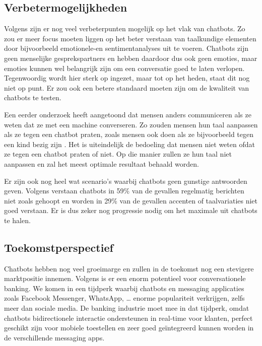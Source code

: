 \subsection{Verbetermogelijkheden}
\label{subsec:verbetermogelijkheden}

Volgens \textcite{Hussain2019} zijn er nog veel verbeterpunten mogelijk op het vlak van chatbots. Zo zou er meer focus moeten liggen op het beter verstaan van taalkundige elementen door bijvoorbeeld emotionele-en sentimentanalyses uit te voeren. Chatbots zijn geen menselijke gesprekspartners en hebben daardoor dus ook geen emoties, maar emoties kunnen wel belangrijk zijn om een conversatie goed te laten verlopen. Tegenwoordig wordt hier sterk op ingezet, maar tot op het heden, staat dit nog niet op punt. Er zou ook een betere standaard moeten zijn om de kwaliteit van chatbots te testen.

Een eerder onderzoek heeft aangetoond dat mensen anders communiceren als ze weten dat ze met een machine converseren. Zo zouden mensen hun taal aanpassen als ze tegen een chatbot praten, zoals mensen ook doen als ze bijvoorbeeld tegen een kind bezig zijn \autocite{Hill2015}. Het is uiteindelijk de bedoeling dat mensen niet weten ofdat ze tegen een chatbot praten of niet. Op die manier zullen ze hun taal niet aanpassen en zal het meest optimale resultaat behaald worden. 

Er zijn ook nog heel wat scenario’s waarbij chatbots geen gunstige antwoorden geven. Volgens \textcite{BRAIN2019} verstaan chatbots in 59\% van de gevallen regelmatig berichten niet zoals gehoopt en worden in 29\% van de gevallen accenten of taalvariaties niet goed verstaan. Er is dus zeker nog progressie nodig om het maximale uit chatbots te halen.

\subsection{Toekomstperspectief}
\label{subsec:toekomstperspectief}

Chatbots hebben nog veel groeimarge en zullen in de toekomst nog een stevigere marktpositie innemen. Volgens \textcite{Andreoli2017} is er een enorm potentieel voor conversationele banking. We komen in een tijdperk waarbij chatbots en messaging applicaties zoals Facebook Messenger, WhatsApp, … enorme populariteit verkrijgen, zelfs meer dan sociale media. De banking industrie moet mee in dat tijdperk, omdat chatbots bidirectionele interactie ondersteunen in real-time voor klanten, perfect geschikt zijn voor mobiele toestellen en zeer goed geïntegreerd kunnen worden in de verschillende messaging apps. 

